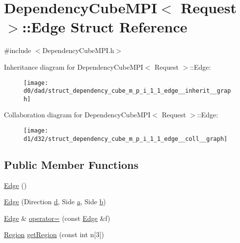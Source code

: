 \hypertarget{struct_dependency_cube_m_p_i_1_1_edge}{}\section{Dependency\+Cube\+M\+P\+I$<$ Request $>$\+:\+:Edge Struct Reference}
\label{struct_dependency_cube_m_p_i_1_1_edge}


{\ttfamily \#include $<$Dependency\+Cube\+M\+P\+I.\+h$>$}



Inheritance diagram for Dependency\+Cube\+M\+P\+I$<$ Request $>$\+:\+:Edge\+:\nopagebreak
\begin{figure}[H]
\begin{center}
\leavevmode
\texttt{[image: d0/dad/struct\_dependency\_cube\_m\_p\_i\_1\_1\_edge\_\_inherit\_\_graph]}
\end{center}
\end{figure}


Collaboration diagram for Dependency\+Cube\+M\+P\+I$<$ Request $>$\+:\+:Edge\+:\nopagebreak
\begin{figure}[H]
\begin{center}
\leavevmode
\texttt{[image: d1/d32/struct\_dependency\_cube\_m\_p\_i\_1\_1\_edge\_\_coll\_\_graph]}
\end{center}
\end{figure}
\subsection*{Public Member Functions}
\begin{DoxyCompactItemize}
\item 
\hyperlink{struct_dependency_cube_m_p_i_1_1_edge_a4300ae373dfb130d69654ba7dc54b42c}{Edge} ()
\item 
\hyperlink{struct_dependency_cube_m_p_i_1_1_edge_aa9e7ee251e0259c647dc41a193e1cf6f}{Edge} (Direction \hyperlink{struct_dependency_cube_m_p_i_1_1_edge_a8669784b9f597960def87cc96ebd0e1f}{d}, Side \hyperlink{struct_dependency_cube_m_p_i_1_1_edge_a08c5f45fa42aa4b3d2177c07f00eb076}{a}, Side \hyperlink{struct_dependency_cube_m_p_i_1_1_edge_a017525e4ab3ec35aa19a4de2c7b6ebc1}{b})
\item 
\hyperlink{struct_dependency_cube_m_p_i_1_1_edge}{Edge} \& \hyperlink{struct_dependency_cube_m_p_i_1_1_edge_a5c268dbc2c12757dadfc0416efc468a1}{operator=} (const \hyperlink{struct_dependency_cube_m_p_i_1_1_edge}{Edge} \&f)
\item 
\hyperlink{struct_region}{Region} \hyperlink{struct_dependency_cube_m_p_i_1_1_edge_a8964aa3679c17660a3647a83514c348d}{get\+Region} (const int n\mbox{[}3\mbox{]})
\end{DoxyCompactItemize}
